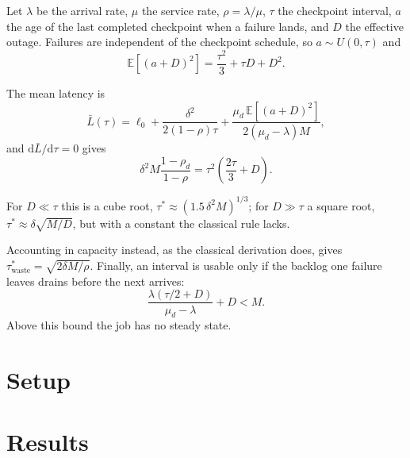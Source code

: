 \documentclass[conference]{IEEEtran}
\begin{document}
Let $\lambda$ be the arrival rate, $\mu$ the service rate, $\rho=\lambda/\mu$,
$\tau$ the checkpoint interval, $a$ the age of the last completed checkpoint
when a failure lands, and $D$ the effective outage. Failures are independent of
the checkpoint schedule, so $a\sim U(0,\tau)$ and
\begin{equation}
  \mathbb{E}\!\left[(a+D)^2\right] = \frac{\tau^2}{3} + \tau D + D^2 .
  \label{eq:moment}
\end{equation}


The mean latency is
\begin{equation}
  \bar{L}(\tau) = \ell_0
    + \frac{\delta^2}{2(1-\rho)\tau}
    + \frac{\mu_d\,\mathbb{E}[(a+D)^2]}{2(\mu_d-\lambda)M},
  \label{eq:objective}
\end{equation}
and $\mathrm{d}\bar{L}/\mathrm{d}\tau = 0$ gives
\begin{equation}
  \delta^2 M \frac{1-\rho_d}{1-\rho} = \tau^2\!\left(\frac{2\tau}{3}+D\right).
  \label{eq:optimum}
\end{equation}

For $D \ll \tau$ this is a cube root, $\tau^\ast \approx (1.5\,\delta^2 M)^{1/3}$;
for $D \gg \tau$ a square root, $\tau^\ast \approx \delta\sqrt{M/D}$, but with a
constant the classical rule lacks.

Accounting in capacity instead, as the classical derivation does, gives
$\tau^\ast_{\text{waste}} = \sqrt{2\delta M/\rho}$. Finally, an interval is
usable only if the backlog one failure leaves drains before the next arrives:
\begin{equation}
  \frac{\lambda(\tau/2 + D)}{\mu_d - \lambda} + D < M .
  \label{eq:stability}
\end{equation}
Above this bound the job has no steady state.

\section{Setup}
\label{sec:setup}


\section{Results}
\label{sec:results}
\end{document}
